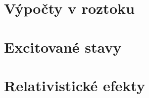 \documentclass[a4paper,12pt]{article}
\numberwithin{equation}{section} %
\begin{document}
\clearpage
\section{Výpočty v roztoku}
\label{kap:solvatace}


\clearpage
\section{Excitované stavy}
\label{kap:excitace}


\clearpage
\section{Relativistické efekty}
\label{kap:relativita}





\end{document}
